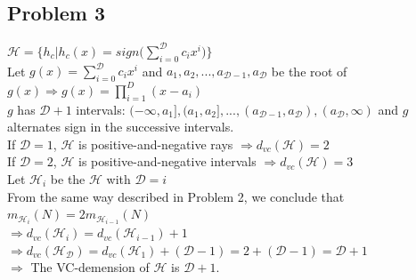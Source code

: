 \documentclass[12pt, a4paper]{article}
\begin{document}
\begin{CJK}{UTF8}{bkai}
	\section*{Problem 3}
		$\mathcal{H} = \Big\{h_c \Big\vert h_c(x) = sign\Big(\sum\limits_{i=0}^{\mathcal{D}}c_ix^i\Big)\Big\}$ \\
		Let $g(x) = \sum\limits_{i=0}^{\mathcal{D}}c_ix^i$ and $a_1, a_2, ..., a_{\mathcal D-1}, a_{\mathcal D}$ be the root of $g(x) \Rightarrow g(x) = \prod\limits_{i=1}^{D}(x-a_i)$\\
		$g$ has $\mathcal{D}+1$ intervals: $(-\infty, a_1], (a_1, a_2],...,(a_{\mathcal{D}-1}, a_{\mathcal{D}}), (a_{\mathcal{D}}, \infty)$ and $g$ alternates sign in the successive intervals. \\
		If $\mathcal{D} = 1$, $\mathcal{H}$ is positive-and-negative rays $\Rightarrow d_{vc}(\mathcal{H}) = 2$\\
		If $\mathcal{D} = 2$, $\mathcal{H}$ is positive-and-negative intervals $\Rightarrow d_{vc}(\mathcal{H}) = 3$ \\
		Let $\mathcal{H}_i$ be the $\mathcal{H}$ with $\mathcal{D} = i$\\
		From the same way described in Problem 2, we conclude that $m_{\mathcal{H}_i}(N)= 2m_{\mathcal{H}_{i-1}}(N)$ \\
		$\Rightarrow d_{vc}(\mathcal{H}_i) = d_{vc}(\mathcal{H}_{i-1})+1$ \\
		$\Rightarrow d_{vc}(\mathcal{H}_\mathcal{D}) = d_{vc}(\mathcal{H}_1)+(\mathcal{D}-1) = 2+(\mathcal{D}-1) = \mathcal{D}+1$ \\
		$\Rightarrow$ The VC-demension of $\mathcal{H}$ is $\mathcal{D}+1$.


\end{CJK}
\end{document}
